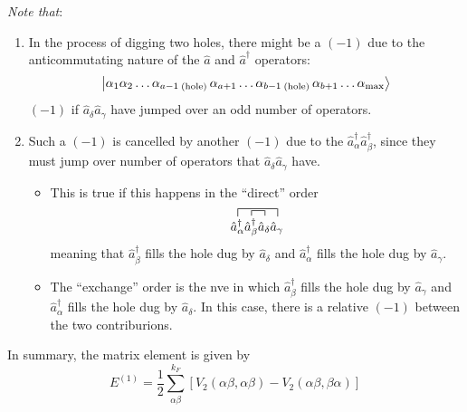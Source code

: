 \documentclass[12pt]{article}
\newcommand{\be}{\begin{equation}}
\newcommand{\ee}{\end{equation}}
\begin{document}
\emph{Note that}:
\begin{enumerate}
\item In the process of digging two holes, there might
be a $(-1)$ due to the anticommutating nature
of the $\hat{a}$ and $\hat{a}^{\dagger}$ operators:
\be
\ket{\alpha_1\alpha_2\ldots\alpha_{a-1}\,{}_\text{(hole)}\,\alpha_{a+1}
\ldots
\alpha_{b-1}\,{}_\text{(hole)}\,\alpha_{b+1}
\ldots
\alpha_{\text{max}}
}
\ee
$(-1)$ if $\hat{a}_{\delta} \hat{a}_{\gamma}$ have jumped over an
odd number of operators.
%
\item Such a $(-1)$ is cancelled by another $(-1)$
due to the $\hat{a}_{\alpha}^{\dagger} \hat{a}_{\beta}^{\dagger}$, since they must jump
over number of operators that $\hat{a}_{\delta} \hat{a}_{\gamma}$ have.
\begin{itemize}
\item This is true if this happens in the
``direct'' order
\[
\contraction[1.5ex]{}%
{\hat{a}_{\alpha}^{\dagger}}%
{\hat{a}_{\beta}^{\dagger}\hat{a}_{\delta}}%
{\hat{a}_{\gamma}}%
\contraction%
{\hat{a}_{\alpha}^{\dagger}}%
{\hat{a}_{\beta}^{\dagger}}{}{\hat{a}_{\delta}}%
{\hat{a}_{\alpha}^{\dagger}}%
{\hat{a}_{\beta}^{\dagger}\hat{a}_{\delta}}%
{\hat{a}_{\gamma}}
\]
meaning that
$\hat{a}^\dagger_{\beta}$ fills the hole dug by $\hat{a}_{\delta}$ and
$\hat{a}^\dagger_{\alpha}$ fills the hole dug by $\hat{a}_{\gamma}$.
\item The ``exchange'' order is the nve in which
$\hat{a}^\dagger_{\beta}$ fills the hole dug by $\hat{a}_{\gamma}$ and
$\hat{a}^\dagger_{\alpha}$ fills the hole dug by $\hat{a}_{\delta}$.
In this case, there is a relative
$(-1)$ between the two contriburions.
\end{itemize}
\end{enumerate}
In summary, the matrix element is given by
\be
E^{(1)}=\frac{1}{2} \sum_{\alpha \beta}^{k_{F}}\left[V_{2}(\alpha \beta, \alpha \beta)-V_{2}(\alpha \beta, \beta \alpha)\right]
\ee
\end{document}

